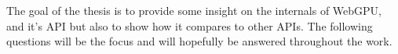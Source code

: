 The goal of the thesis is to provide some insight on the internals of 
WebGPU, and it's API but also to show how it compares to other APIs. The following
questions will be the focus and will hopefully be answered throughout the work.